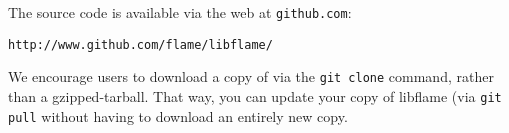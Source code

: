 
The \libflame source code is available via the web at {\tt github.com}:
\begin{Verbatim}[frame=none,framesep=2.5mm,xleftmargin=5mm,commandchars=\\\{\},fontsize=\normalsize]
http://www.github.com/flame/libflame/
\end{Verbatim}
We encourage users to download a copy of \libflame via the {\tt git clone}
command, rather than a gzipped-tarball.
That way, you can update your copy of libflame (via {\tt git pull} without
having to download an entirely new copy.



